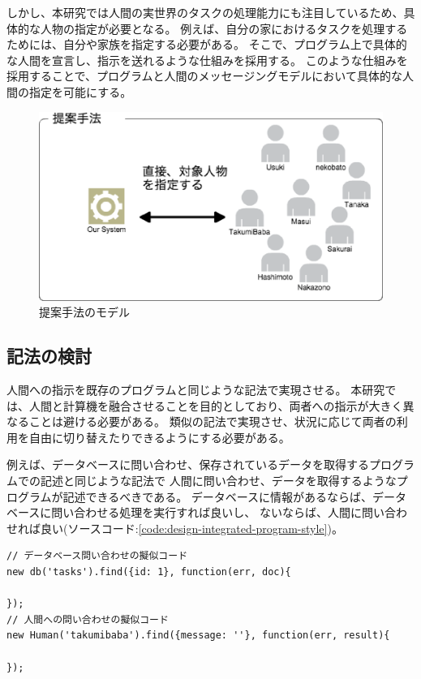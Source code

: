 しかし、本研究では人間の実世界のタスクの処理能力にも注目しているため、具体的な人物の指定が必要となる。
例えば、自分の家におけるタスクを処理するためには、自分や家族を指定する必要がある。
そこで、プログラム上で具体的な人間を宣言し、指示を送れるような仕組みを採用する。
このような仕組みを採用することで、プログラムと人間のメッセージングモデルにおいて具体的な人間の指定を可能にする。

\begin{figure}[htbp]
  \begin{center}
  \includegraphics[width=.5\linewidth]{images/unique_id_model.eps}
  \end{center}
  \caption{提案手法のモデル}
  \label{fig:unique_id_model}
\end{figure}

\subsection{記法の検討}\label{ux8a18ux6cd5ux306eux691cux8a0e}

人間への指示を既存のプログラムと同じような記法で実現させる。
本研究では、人間と計算機を融合させることを目的としており、両者への指示が大きく異なることは避ける必要がある。
類似の記法で実現させ、状況に応じて両者の利用を自由に切り替えたりできるようにする必要がある。

例えば、データベースに問い合わせ、保存されているデータを取得するプログラムでの記述と同じような記法で
人間に問い合わせ、データを取得するようなプログラムが記述できるべきである。
データベースに情報があるならば、データベースに問い合わせる処理を実行すれば良いし、
ないならば、人間に問い合わせれば良い(ソースコード:\ref{code:design-integrated-program-style})。

\begin{lstlisting}[caption=人間への指示を計算機への指示と類似させる, label=code:design-integrated-program-style]
// データベース問い合わせの擬似コード
new db('tasks').find({id: 1}, function(err, doc){

});
// 人間への問い合わせの擬似コード
new Human('takumibaba').find({message: ''}, function(err, result){

});
\end{lstlisting}

